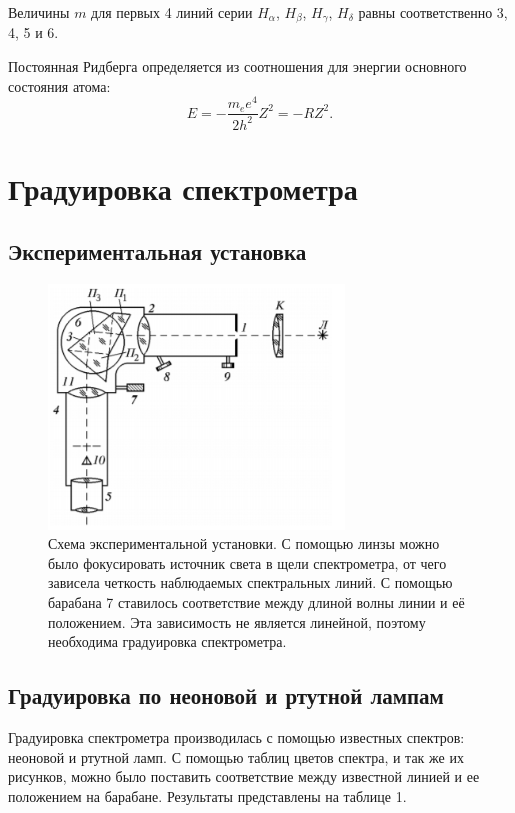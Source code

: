 \documentclass[a4paper, 14pt]{extarticle}%
\newcommand\ECaption[1]{%
     \captionsetup{font=footnotesize}%
     \caption{#1}}
\begin{document}
Величины $m$ для первых 4 линий серии $ H_{\alpha} $, $ H_{\beta} $, $ H_{\gamma} $, $ H_{\delta} $ равны соответственно 3, 4, 5 и 6.

Постоянная Ридберга определяется из соотношения для энергии основного состояния атома:
\begin{equation}
E = -\frac{m_ee^4}{2h^2}Z^2 = -RZ^2.
\end{equation}

\section*{Градуировка спектрометра}

\subsection*{Экспериментальная установка}

\begin{figure}[h]
\begin{center}
\includegraphics[width=0.7\textwidth]{ust}
\end{center}
\ECaption{Схема экспериментальной установки. С помощью линзы можно было фокусировать источник света в щели спектрометра, от чего зависела четкость наблюдаемых спектральных линий. С помощью барабана 7 ставилось соответствие между длиной волны линии и её положением. Эта зависимость не является линейной, поэтому необходима градуировка спектрометра.}
\end{figure}

\subsection*{Градуировка по неоновой и ртутной лампам}

Градуировка спектрометра производилась с помощью известных спектров: неоновой и ртутной ламп. С помощью таблиц цветов спектра, и так же их рисунков, можно было поставить соответствие между известной линией и ее положением на барабане. Результаты представлены на таблице 1.
\end{document}
